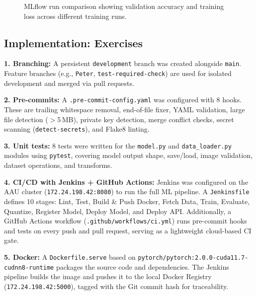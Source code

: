 \documentclass[10pt,twocolumn,letterpaper]{article}
\begin{document}
\begin{figure}[h]
    \centering
    \caption{MLflow run comparison showing validation accuracy and training loss across different training runs.}
    \label{fig:mlflow-comparison}
\end{figure}

\subsection{Implementation: Exercises}

\textbf{1. Branching:} A persistent \texttt{development} branch was created alongside \texttt{main}. Feature branches (e.g., \texttt{Peter}, \texttt{test-required-check}) are used for isolated development and merged via pull requests.

\textbf{2. Pre-commits:} A \texttt{.pre-commit-config.yaml} was configured with 8 hooks. These are trailing whitespace removal, end-of-file fixer, YAML validation, large file detection ($>$5\,MB), private key detection, merge conflict checks, secret scanning (\texttt{detect-secrets}), and Flake8 linting.

\textbf{3. Unit tests:} 8 tests were written for the \texttt{model.py} and \texttt{data\_loader.py} modules using \texttt{pytest}, covering model output shape, save/load, image validation, dataset operations, and transforms.

\textbf{4. CI/CD with Jenkins + GitHub Actions:} Jenkins was configured on the AAU cluster (\texttt{172.24.198.42:8080}) to run the full ML pipeline. A \texttt{Jenkinsfile} defines 10 stages: Lint, Test, Build \& Push Docker, Fetch Data, Train, Evaluate, Quantize, Register Model, Deploy Model, and Deploy API. Additionally, a GitHub Actions workflow (\texttt{.github/workflows/ci.yml}) runs pre-commit hooks and tests on every push and pull request, serving as a lightweight cloud-based CI gate.

\textbf{5. Docker:} A \texttt{Dockerfile.serve} based on \texttt{pytorch/pytorch:2.0.0-cuda11.7-cudnn8-runtime} packages the source code and dependencies. The Jenkins pipeline builds the image and pushes it to the local Docker Registry (\texttt{172.24.198.42:5000}), tagged with the Git commit hash for traceability.
\end{document}
